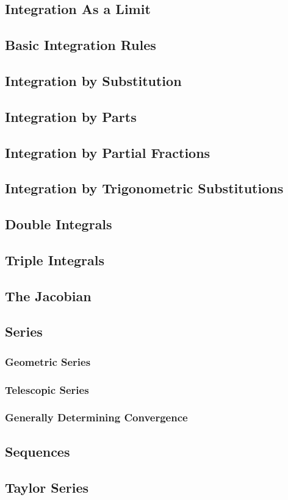 \documentclass[../Math_Notes.tex]{subfiles}
\begin{document}
\subsection{Integration As a Limit}
\subsection{Basic Integration Rules}
\subsection{Integration by Substitution}
\subsection{Integration by Parts}
\subsection{Integration by Partial Fractions}
\subsection{Integration by Trigonometric Substitutions}
\subsection{Double Integrals}
\subsection{Triple Integrals}
\subsection{The Jacobian}
\subsection{Series}
  \subsubsection{Geometric Series}
  \subsubsection{Telescopic Series}
  \subsubsection{Generally Determining Convergence}
\subsection{Sequences}
\subsection{Taylor Series}
\end{document}
